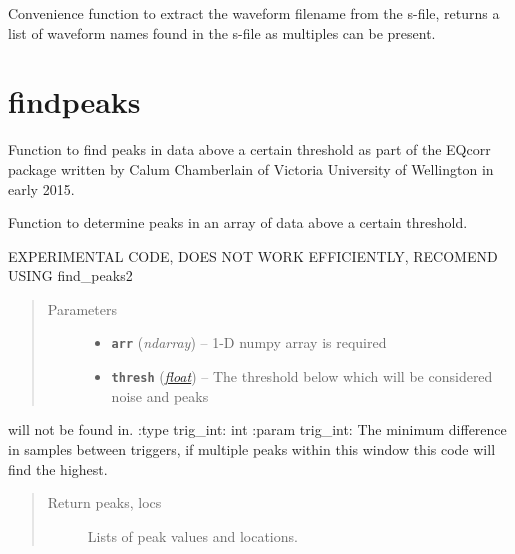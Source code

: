 \documentclass[a4paper,10pt,english]{sphinxmanual}
\begin{document}

\begin{fulllineitems}
\label{modules:Sfile_util.readwavename}
Convenience function to extract the waveform filename from the s-file,
returns a list of waveform names found in the s-file as multiples can
be present.

\end{fulllineitems}



\section{findpeaks}
\label{modules:module-findpeaks}\label{modules:findpeaks}
Function to find peaks in data above a certain threshold as part of the EQcorr
package written by Calum Chamberlain of Victoria University of Wellington in
early 2015.

\begin{fulllineitems}
\label{modules:findpeaks.find_peaks}
Function to determine peaks in an array of data above a certain threshold.

EXPERIMENTAL CODE, DOES NOT WORK EFFICIENTLY, RECOMEND USING find\_peaks2
\begin{quote}\begin{description}
\item[{Parameters}] \leavevmode\begin{itemize}
\item {} 
\textbf{\texttt{arr}} (\emph{ndarray}) -- 1-D numpy array is required

\item {} 
\textbf{\texttt{thresh}} (\href{https://docs.python.org/library/functions.html\#float}{\emph{float}}) -- The threshold below which will be considered noise and peaks

\end{itemize}

\end{description}\end{quote}

will not be found in.
:type trig\_int: int
:param trig\_int: The minimum difference in samples between triggers,
if multiple peaks within this window this code will find the highest.
\begin{quote}\begin{description}
\item[{Return peaks, locs}] \leavevmode
Lists of peak values and locations.

\end{description}\end{quote}

\end{fulllineitems}
\end{document}
